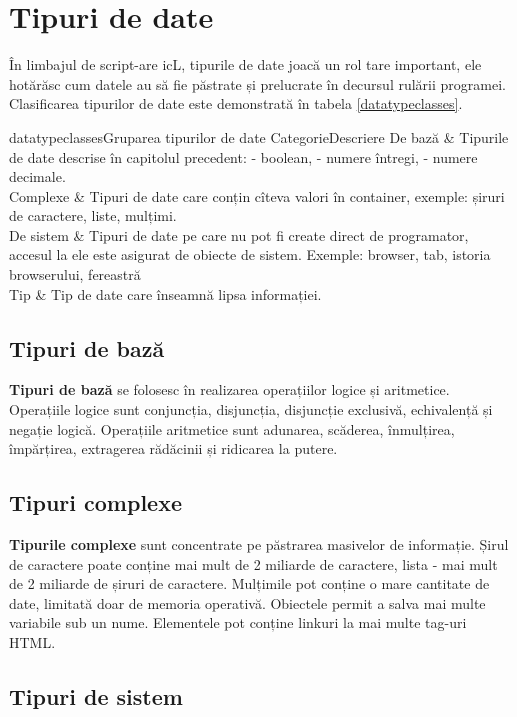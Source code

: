 \section{Tipuri de date}

În limbajul de script-are icL, tipurile de date joacă un rol tare important, ele hotărăsc cum datele au să fie păstrate și prelucrate în decursul rulării programei. Clasificarea tipurilor de date este demonstrată în tabela \ref{datatypeclasses}.

\stabletwo{3.5cm}{13.6cm}
{datatypeclasses}{Gruparea tipurilor de date}
{Categorie}{Descriere}
{
	De bază     & Tipurile de date descrise în capitolul precedent: \bool{} - boolean, \integer{} - numere întregi, \double{} - numere decimale. \\ \hline
	Complexe    & Tipuri de date care conțin cîteva valori în container, exemple: șiruri de caractere, liste, mulțimi. \\ \hline
	De sistem   & Tipuri de date pe care nu pot fi create direct de programator, accesul la ele este asigurat de obiecte de sistem. Exemple: browser, tab, istoria browserului, fereastră \\ \hline
	Tip \void{} & Tip de date care înseamnă lipsa informației.
}

\subsection{Tipuri de bază}

{\bf Tipuri de bază} se folosesc în realizarea operațiilor logice și aritmetice. Operațiile logice sunt conjuncția, disjuncția, disjuncție exclusivă, echivalență și negație logică. Operațiile aritmetice sunt adunarea, scăderea, înmulțirea, împărțirea, extragerea rădăcinii și ridicarea la putere.

\subsection{Tipuri complexe}

{\bf Tipurile complexe} sunt concentrate pe păstrarea masivelor de informație. Șirul de caractere poate conține mai mult de 2 miliarde de caractere, lista - mai mult de 2 miliarde de șiruri de caractere. Mulțimile pot conține o mare cantitate de date, limitată doar de memoria operativă. Obiectele permit a salva mai multe variabile sub un nume. Elementele pot conține linkuri la mai multe tag-uri HTML.

\subsection{Tipuri de sistem}

